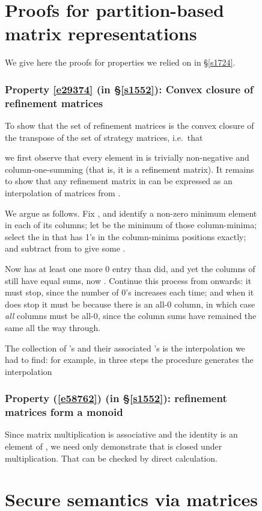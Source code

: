 \documentclass[runningheads]{llncs}
\newcommand\Sec[1] {Sec.~\ref{#1}}
\renewcommand\Sec[1] {\S\ref{#1}}
\newcommand\Eqn[1] {(\ref{#1})}
\newenvironment{Figure}[2][t]{\begin{figure}[#1]\def\Label{#2}\small}{\label{\Label}\end{figure}}
\begin{document}
\begin{Figure}[ht!]{f1228}
\section{Proofs for partition-based matrix representations}\label{a39475}

We give here the proofs for properties we relied on in \Sec{s1724}.

\subsubsection{Property \ref{e29374} (in \Sec{s1552}): Convex closure of refinement matrices}

To show that the set of  refinement matrices is the convex closure of the transpose of the set of  strategy matrices, i.e.\ that

we first observe  that every element in  is trivially non-negative and column-one-summing (that is, it is a refinement matrix). It remains to show  that any refinement matrix  in  can be expressed as an interpolation of matrices from .

We argue as follows. Fix , and identify a non-zero minimum element
in each of its columns; let  be the minimum of those column-minima;
select the  in  that has 1's in the column-minima
positions exactly; and subtract  from  to give some .

Now  has at least one more 0 entry than  did, and yet the columns of  still have equal sums, now . Continue this process from  onwards: it must stop, since the number of 0's increases each time; and when it does stop it must be because there is an all-0 column, in which case \emph{all} columns must be all-0, since the column sums have remained the same all the way through.\par
The collection of 's and their associated 's is the interpolation we had to find: for example, in three steps the procedure generates the interpolation


\subsubsection{Property \Eqn{e58762} (in \Sec{s1552}): refinement matrices form a monoid}

Since matrix multiplication is associative and the identity  is an element of , we need only demonstrate that  is closed under multiplication. That can be checked by direct calculation.

\section{Secure semantics via matrices} \label{a394759}


\end{Figure}
\end{document}
